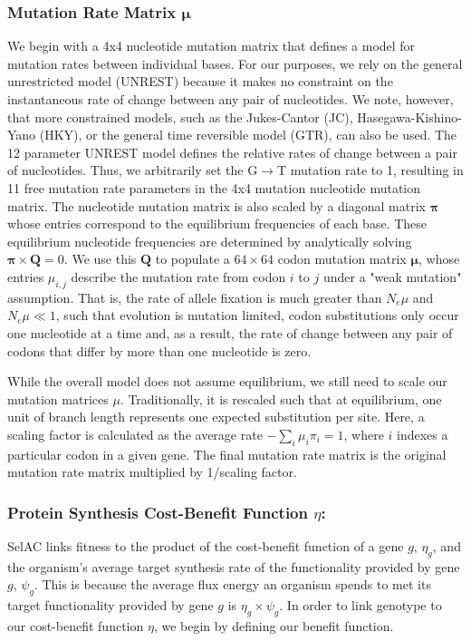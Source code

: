\documentclass{article}
\newcommand{\Nemu}{\ensuremath{{N_e \mu}}\xspace} %
\newcommand{\pimatrix}{\ensuremath{\mathbf{\pi}}\xspace}
\newcommand{\mumatrix}{\ensuremath{\mathbf{\mu}}\xspace}
\newcommand{\Qmatrix}{\ensuremath{\mathbf{Q}}\xspace}
\newcommand{\selac}{SelAC\xspace}
\newcommand{\etag}{\ensuremath{\eta_g}\xspace}
\newcommand{\muij}{\ensuremath{\mu_{i,j}}\xspace}
\newcommand{\psig}{\ensuremath{\psi_{g}}\xspace}
\begin{document}
\subsubsection*{Mutation Rate Matrix \mumatrix}
We begin with a 4x4 nucleotide mutation matrix that defines a model for mutation rates between individual bases.
For our purposes, we rely on the general unrestricted model (UNREST) \citep{Yang1994} because it makes no constraint on the instantaneous rate of change between any pair of nucleotides.
We note, however, that more constrained models, such as the Jukes-Cantor (JC), Hasegawa-Kishino-Yano (HKY), or the general time reversible model (GTR), can also be used.
The 12 parameter UNREST model defines the relative rates of change between a pair of nucleotides.
Thus, we arbitrarily set the G$\rightarrow$T mutation rate to 1, resulting in 11 free mutation rate parameters in the 4x4 mutation nucleotide mutation matrix.
The nucleotide mutation matrix is also scaled by a diagonal matrix \pimatrix whose entries correspond to the equilibrium frequencies of each base.
These equilibrium nucleotide frequencies are determined by analytically solving $\pimatrix \times \Qmatrix = 0$. 
We use this \Qmatrix to populate a $64 \times 64$ codon mutation matrix $\mumatrix$, whose entries $\muij$ describe the mutation rate from codon $i$ to $j$ under a "weak mutation" assumption.
That is, the rate of allele fixation is much greater than \Nemu and $\Nemu \ll 1$, such that evolution is mutation limited, codon substitutions only occur one nucleotide at a time and, as a result, the rate of change between any pair of codons that differ by more than one nucleotide is zero.

While the overall model does not assume equilibrium, we still need to scale our mutation matrices $\mu$.
Traditionally, it is rescaled such that at equilibrium, one unit of branch length represents one expected substitution per site.
Here, a scaling factor is calculated as the average rate $-\sum_i \mu_i \pi_i=1$, where $i$ indexes a particular codon in a given gene.
The final mutation rate matrix is the original mutation rate matrix multiplied by 1/scaling factor.

\subsubsection*{Protein Synthesis Cost-Benefit Function $\eta$: }
\selac links fitness to the product of the cost-benefit function of a gene $g$, $\etag$, and the organism's average target synthesis rate of the functionality provided by gene $g$, $\psig$.
This is because the average flux energy an organism spends to met its target functionality provided by gene $g$ is $\etag \times \psig$.
In order to link genotype to our cost-benefit function $\eta$, we begin by defining our benefit function.
\end{document}
